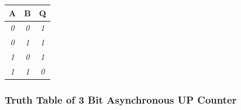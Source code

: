 \documentclass[11pt]{article}
\begin{document}
\begin{table}[H]
	\begin{tabular}{|c|c|c|}
		\hline
		{\color[HTML]{000000} \textbf{A}} & {\color[HTML]{000000} \textbf{B}} & {\color[HTML]{000000} \textbf{Q}} \\ \hline
		{\color[HTML]{330001} \textit{0}} & {\color[HTML]{330001} \textit{0}} & {\color[HTML]{F56B00} \textit{1}} \\ \hline
		{\color[HTML]{330001} \textit{0}} & {\color[HTML]{330001} \textit{1}} & {\color[HTML]{F56B00} \textit{1}} \\ \hline
		{\color[HTML]{330001} \textit{1}} & {\color[HTML]{330001} \textit{0}} & {\color[HTML]{F56B00} \textit{1}} \\ \hline
		{\color[HTML]{330001} \textit{1}} & {\color[HTML]{330001} \textit{1}} & {\color[HTML]{F56B00} \textit{0}} \\ \hline
	\end{tabular}
\end{table}
\subsubsection{Truth Table of 3 Bit Asynchronous UP Counter}
\end{document}
